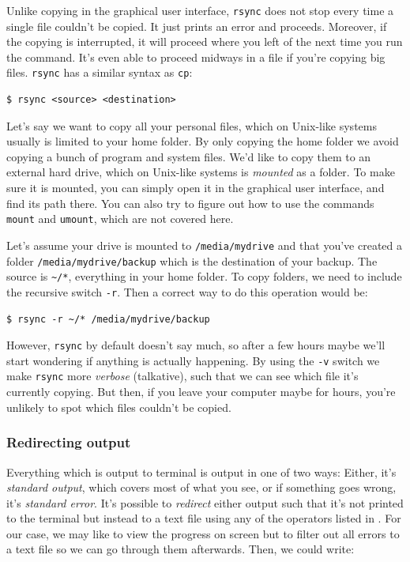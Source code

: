 Unlike copying in the graphical user interface, \verb|rsync| does not stop every time a single file couldn't be copied. It just prints an error and proceeds. Moreover, if the copying is interrupted, it will proceed where you left of the next time you run the command. It's even able to proceed midways in a file if you're copying big files. \verb|rsync| has a similar syntax as \verb|cp|:

\begin{verbatim}
$ rsync <source> <destination>
\end{verbatim}
Let's say we want to copy all your personal files, which on Unix-like systems usually is limited to your home folder. By only copying the home folder we avoid copying a bunch of program and system files. We'd like to copy them to an external hard drive, which on Unix-like systems is \emph{mounted} as a folder. To make sure it is mounted, you can simply open it in the graphical user interface, and find its path there. You can also try to figure out how to use the commands \verb|mount| and \verb|umount|, which are not covered here.

Let's assume your drive is mounted to \verb|/media/mydrive| and that you've created a folder \verb|/media/mydrive/backup| which is the destination of your backup. The source is \verb|~/*|, everything in your home folder. To copy folders, we need to include the recursive switch \verb|-r|. Then a correct way to do this operation would be:

\begin{verbatim}
$ rsync -r ~/* /media/mydrive/backup
\end{verbatim}
However, \verb|rsync| by default doesn't say much, so after a few hours maybe we'll start wondering if anything is actually happening. By using the \verb|-v| switch we make \verb|rsync| more \emph{verbose} (talkative), such that we can see which file it's currently copying. But then, if you leave your computer maybe for hours, you're unlikely to spot which files couldn't be copied.

\subsubsection{Redirecting output}
Everything which is output to terminal is output in one of two ways: Either, it's \emph{standard output}, which covers most of what you see, or if something goes wrong, it's \emph{standard error}. It's possible to \emph{redirect} either output such that it's not printed to the terminal but instead to a text file using any of the operators listed in . For our case, we may like to view the progress on screen but to filter out all errors to a text file so we can go through them afterwards. Then, we could write:

